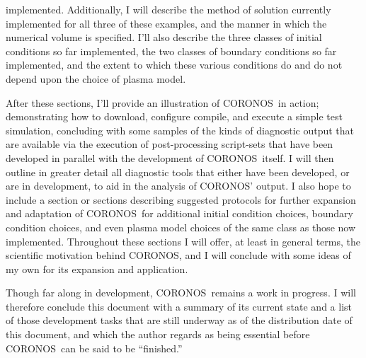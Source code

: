 \documentclass[12pt]{memoir}
\newcommand{\coronos}{\textsf{CORONOS}}
\begin{document}
implemented. Additionally, I will describe the method of solution currently
implemented for all three of these examples, and the manner in which the
numerical volume is specified. I'll also describe the three classes of initial
conditions so far implemented, the two classes of boundary conditions so far
implemented, and the extent to which these various conditions do and do not
depend upon the choice of plasma model.
%
\par
%
After these sections, I'll provide an illustration of \coronos\ in action;
demonstrating how to download, configure compile, and execute a simple test
simulation, concluding with some samples of the kinds of diagnostic output
that are available via the execution of post-processing script-sets that have
been developed in parallel with the development of \coronos\ itself. I will
then outline in greater detail all diagnostic tools that either have been
developed, or are in development, to aid in the analysis of \coronos' output.
I also hope to include a section or sections describing suggested protocols
for further expansion and adaptation of \coronos\ for additional initial
condition choices, boundary condition choices, and even plasma model choices
of the same class as those now implemented. Throughout these sections I will
offer, at least in general terms, the scientific motivation behind \coronos,
and I will conclude with some ideas of my own for its expansion and
application.
%
\par
%
Though far along in development, \coronos\ remains a work in progress.
I will therefore conclude this document with a summary of its current
state and a list of those development tasks that are still underway as
of the distribution date of this document, and which the author regards
as being essential before \coronos\ can be said to be ``finished.''
%
\par
%
\end{document}

